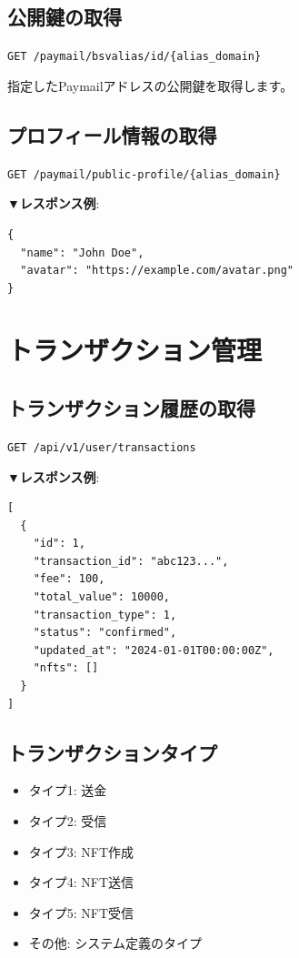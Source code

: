\documentclass[11pt,a4paper]{ltjsarticle}  %
\begin{document}
\subsection{公開鍵の取得}

\begin{tcolorbox}[colback=blue!5,colframe=blue!50!black,title=エンドポイント]
\texttt{GET /paymail/bsvalias/id/\{alias\_domain\}}
\end{tcolorbox}

指定したPaymailアドレスの公開鍵を取得します。

\subsection{プロフィール情報の取得}

\begin{tcolorbox}[colback=blue!5,colframe=blue!50!black,title=エンドポイント]
\texttt{GET /paymail/public-profile/\{alias\_domain\}}
\end{tcolorbox}

\textbf{▼レスポンス例}:
\begin{lstlisting}[style=json]
{
  "name": "John Doe",
  "avatar": "https://example.com/avatar.png"
}
\end{lstlisting}

\section{トランザクション管理}

\subsection{トランザクション履歴の取得}

\begin{tcolorbox}[colback=blue!5,colframe=blue!50!black,title=エンドポイント]
\texttt{GET /api/v1/user/transactions}
\end{tcolorbox}

\textbf{▼レスポンス例}:
\begin{lstlisting}[style=json]
[
  {
    "id": 1,
    "transaction_id": "abc123...",
    "fee": 100,
    "total_value": 10000,
    "transaction_type": 1,
    "status": "confirmed",
    "updated_at": "2024-01-01T00:00:00Z",
    "nfts": []
  }
]
\end{lstlisting}

\subsection{トランザクションタイプ}
\begin{itemize}
    \item タイプ1: 送金
    \item タイプ2: 受信
    \item タイプ3: NFT作成
    \item タイプ4: NFT送信
    \item タイプ5: NFT受信
    \item その他: システム定義のタイプ
\end{itemize}
\end{document}
